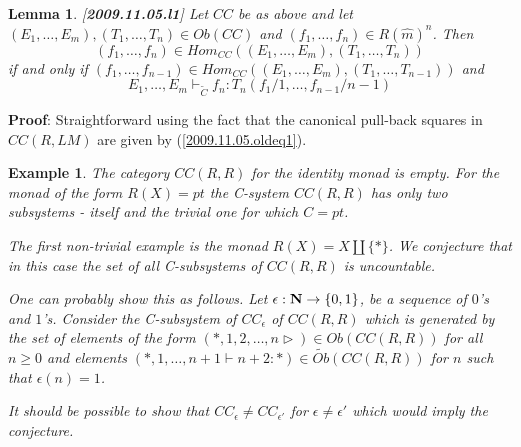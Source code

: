 \documentclass[11pt]{article}
\newenvironment{proof}{{\bf Proof}:}{\vskip 5mm }
\newtheorem{lemma}[proposition]{Lemma}
\newtheorem{example}[proposition]{Example}
\newcommand{\llabel}[1]{\label{#1}[{\bf #1}]}
\newcommand{\sr}{\rightarrow}
\newcommand{\nn}{{\bf N\rm}}
\newcommand{\wt}{\widetilde}
\newcommand{\wh}{\widehat}
\begin{document}
\begin{lemma}
\llabel{2009.11.05.l1}
Let $CC$ be as above and let $(E_1,\dots, E_m), (T_1,\dots,T_n)\in Ob(CC)$ and $(f_1,\dots,f_n)\in R(\wh{m})^n$. Then  
%
$$(f_1,\dots,f_n)\in Hom_{CC}((E_1,\dots, E_m), (T_1,\dots,T_n))$$
%
if and only if $(f_1,\dots,f_{n-1})\in Hom_{CC}((E_1,\dots, E_m), (T_1,\dots,T_{n-1}))$ and 
%
$$E_1,\dots,E_m\vdash_{\wt{C}} f_n : T_{n}(f_1/1,\dots,f_{n-1}/n-1)$$
%
\end{lemma}
%
\begin{proof}
Straightforward using the fact that the canonical pull-back squares in $CC(R,LM)$ are given by (\ref{2009.11.05.oldeq1}).
\end{proof}
%
\begin{example}\rm
The category $CC(R,R)$ for the identity monad is empty. For the monad of the form $R(X)=pt$ the C-system $CC(R,R)$ has only two subsystems - itself and the trivial one for which $C={pt}$. 

The first non-trivial example is the monad $R(X)=X\amalg \{*\}$. We conjecture that in this case the set of all C-subsystems of $CC(R,R)$ is {\em uncountable}.

One can probably show this as follows. Let $\epsilon:\nn\sr\{0,1\}$, be a sequence of $0$'s and $1$'s. Consider the C-subsystem of $CC_{\epsilon}$ of $CC(R,R)$ which is generated by the set of elements of the form $(*, 1, 2, \dots, n\rhd)\in Ob(CC(R,R))$ for all $n\ge 0$ and elements $(*,1,\dots,n+1\vdash n+2:*)\in \wt{Ob}(CC(R,R))$ for $n$ such that $\epsilon(n)=1$. 

It should be possible to show that $CC_{\epsilon}\ne CC_{\epsilon'}$ for $\epsilon\ne \epsilon'$ which would imply the conjecture. 
\end{example}
\end{document}
